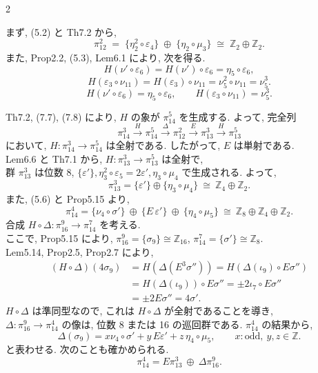 \documentclass[10pt, leqno]{ltjsarticle}
\newcommand{\gen}[1]{\{#1\}}       %
\newcommand{\pit}[2]{\pi_{#1}^{#2}}
\numberwithin{equation}{section}
\theoremstyle{plain}
\theoremstyle{definition}
\theoremstyle{remark}
\begin{document}
\begin{paracol}{2}

まず, (5.2) と Th7.2 から,
\[
  \pit{12}{2} \;=\; \gen{\eta_{2}^{2}\circ \varepsilon_{4}} \;\oplus\; \gen{\eta_{2}\circ \mu_{3}}
  \;\cong\; \mathbb Z_{2}\oplus\mathbb Z_{2}.
\]
また,  Prop2.2, (5.3),  Lem6.1 により, 次を得る. 
\[
H(\nu'\circ\varepsilon_6) = H(\nu')\circ\varepsilon_6 = \eta_5\circ\varepsilon_6,
\]
\[
H(\varepsilon_3\circ\nu_{11}) = H(\varepsilon_3)\circ\nu_{11}
= \nu_5^2\circ\nu_{11} = \nu_5^3 .
\]
\begin{equation}\label{eq:78}
H(\nu'\circ \varepsilon_{6})=\eta_{5}\circ \varepsilon_{6},\qquad
H(\varepsilon_{3}\circ \nu_{11})=\nu_{5}^{3} .
\end{equation}



\noindent
Th7.2, (7.7), (7.8) により, 
\(H\) の象が \(\pit{14}{5}\) を生成する. 
よって, 完全列
\[
  \pit{14}{3}\xrightarrow{H}  
  \pit{14}{5}\xrightarrow{\ \Delta\ }\pit{12}{2}\xrightarrow{\ E\ }\pit{13}{3}
  \xrightarrow{\ H\ }\pit{13}{5}
\]
において, \(H:\pit{14}{3}\to\pit{14}{5}\) は全射である. 
したがって, \(E\) は単射である. \\
Lem6.6 と Th7.1 から, 
\(H:\pit{13}{3}\to\pit{13}{5}\) は全射で, \\
群 \(\pit{13}{3}\) は位数 8, 
\(\gen{\varepsilon'}, \eta_3^2\circ\varepsilon_5 = 2\varepsilon',
\eta_{3}\circ\mu_{4}\) で生成される. 
よって, 
\[
  \pit{13}{3}=\gen{\varepsilon'}\oplus\gen{\eta_{3}\circ\mu_{4}}
  \ \cong\ \mathbb Z_{4}\oplus\mathbb Z_{2}.
\]
また, (5.6) と Prop5.15 より, 
\[
  \pit{14}{4}
   = \gen{\nu_{4}\circ\sigma'}\ \oplus\ \gen{E\,\varepsilon'}\ \oplus\ \gen{\eta_{4}\circ\mu_{5}}
   \ \cong\ \mathbb Z_{8}\oplus\mathbb Z_{4}\oplus\mathbb Z_{2}.
\]
合成 \(H\circ\Delta:\pit{16}{9}\to\pit{14}{7}\) を考える. \\
ここで,  Prop5.15 により, 
\(\pit{16}{9}=\gen{\sigma_{9}}\cong\mathbb Z_{16}\), \(\pit{14}{7}=
\gen{\sigma'}\cong\mathbb Z_{8}\).\\
Lem5.14,  Prop2.5,  Prop2.7 により,
\[
\begin{align*}
  (H\circ\Delta)(4\sigma_9)
  & = H(\Delta(E^{3}\sigma'')) = H(\Delta(\iota_{9})\circ E\sigma'') \\
  & = H(\Delta(\iota_{9}))\circ E\sigma''=\pm 2\iota_{7}\circ E\sigma''\\
  & = \pm 2E\sigma'' = 4\sigma' .
\end{align*}
\]
\(H\circ\Delta\) は準同型なので, これは \(H\circ\Delta\) が全射であることを導き, \\
\(\Delta:\pit{16}{9}\to\pit{14}{4}\) の像は, 位数 8 または 16 の巡回群である. 
\(\pit{14}{4}\) の結果から, 
\[
  \Delta(\sigma_{9}) 
  = x\nu_{4}\circ\sigma' + y\,E\varepsilon' + z\,\eta_{4}\circ\mu_{5},\qquad
  x:\text{odd},\ y,z\in\mathbb{Z} .
\]
と表わせる.
次のことも確かめられる. 
\[
  \pit{14}{4}=E\pit{13}{3}\ \oplus\ \Delta\pit{16}{9}.
\]


\end{paracol}
\end{document}

